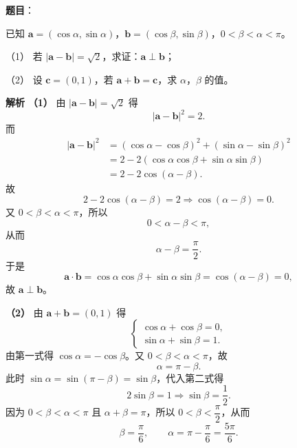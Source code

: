 \begin{answer}

\textbf{题目}：

已知 $\boldsymbol a=(\cos\alpha,\sin\alpha)$，$\boldsymbol b=(\cos\beta,\sin\beta)$，$0<\beta<\alpha<\pi$。

（1） 若 $|\boldsymbol a-\boldsymbol b|=\sqrt2$，求证：$\boldsymbol a\perp\boldsymbol b$；

（2） 设 $\boldsymbol c=(0,1)$，若 $\boldsymbol a+\boldsymbol b=\boldsymbol c$，求 $\alpha$，$\beta$ 的值。

\textbf{解析}
\textbf{（1）} 由 $|\boldsymbol a-\boldsymbol b|=\sqrt2$ 得
\nopagebreak[4]
\[|\boldsymbol a-\boldsymbol b|^2=2.\]
而
\nopagebreak[4]
\[\begin{aligned}
|\boldsymbol a-\boldsymbol b|^2
&=(\cos\alpha-\cos\beta)^2+(\sin\alpha-\sin\beta)^2\\
&=2-2(\cos\alpha\cos\beta+\sin\alpha\sin\beta)\\
&=2-2\cos(\alpha-\beta).
\end{aligned}\]
故
\nopagebreak[4]
\[2-2\cos(\alpha-\beta)=2
\Longrightarrow \cos(\alpha-\beta)=0.\]
又 $0<\beta<\alpha<\pi$，所以
\nopagebreak[4]
\[0<\alpha-\beta<\pi,\]
从而
\nopagebreak[4]
\[\alpha-\beta=\frac{\pi}{2}.\]
于是
\nopagebreak[4]
\[\boldsymbol a\cdot\boldsymbol b=\cos\alpha\cos\beta+\sin\alpha\sin\beta
=\cos(\alpha-\beta)=0,\]
故 $\boldsymbol a\perp\boldsymbol b$。

\textbf{（2）} 由 $\boldsymbol a+\boldsymbol b=(0,1)$ 得
\nopagebreak[4]
\[\begin{cases}
\cos\alpha+\cos\beta=0,\\
\sin\alpha+\sin\beta=1.
\end{cases}\]
由第一式得 $\cos\alpha=-\cos\beta$。又 $0<\beta<\alpha<\pi$，故
\nopagebreak[4]
\[\alpha=\pi-\beta.\]
此时 $\sin\alpha=\sin(\pi-\beta)=\sin\beta$，代入第二式得
\nopagebreak[4]
\[2\sin\beta=1
\Longrightarrow \sin\beta=\frac12.\]
因为 $0<\beta<\alpha<\pi$ 且 $\alpha+\beta=\pi$，所以 $0<\beta<\dfrac{\pi}{2}$，从而
\nopagebreak[4]
\[\beta=\frac{\pi}{6},\qquad \alpha=\pi-\frac{\pi}{6}=\frac{5\pi}{6}.\]



\end{answer}
